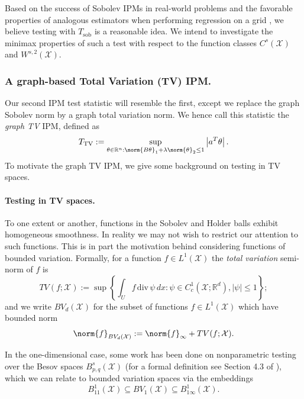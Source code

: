 \documentclass{article}
\newcommand{\Reals}{\mathbb{R}}
\newcommand{\abs}[1]{\left \lvert #1 \right \rvert}
\newcommand{\1}{\mathbf{1}}
\newcommand{\dive}{\mathrm{div}}
\theoremstyle{alden}
\theoremstyle{aldenthm}
\theoremstyle{definition}
\theoremstyle{remark}
\begin{document}
Based on the success of Sobolev IPMs in real-world problems \citet{mroueh17,arbel18} and the favorable properties of analogous estimators when performing regression on a grid \citet{sadhanala16}, we believe testing with $T_{\textrm{sob}}$ is a reasonable idea. We intend to investigate the minimax properties of such a test with respect to the function classes $C^s(\mathcal{X})$ and $W^{s,2}(\mathcal{X})$.


\subsubsection{A graph-based Total Variation (TV) IPM.}
Our second IPM test statistic will resemble the first, except we replace the graph Sobolev norm by a graph total variation norm. We hence call this statistic the \emph{graph TV} IPM, defined as
\begin{equation*}
T_{\mathrm{TV}} := \sup_{\theta \in \Reals^n: \norm{B\theta}_1 + \lambda\norm{\theta}_2 \leq 1} \abs{a^T \theta}.
\end{equation*}
To motivate the graph TV IPM, we give some background on testing in TV spaces.

\paragraph{Testing in TV spaces.}

To one extent or another, functions in the Sobolev and Holder balls exhibit homogeneous smoothness. In reality we may not wish to restrict our attention to such functions. This is in part the motivation behind considering functions of bounded variation. Formally, for a function $f \in L^1(\mathcal{X})$ the \emph{total variation} semi-norm of $f$ is \citet{evans15}
\begin{equation*}
TV(f;\mathcal{X}) := \sup \left\{ \int_U f \, \dive \, \psi \,dx : \psi \in C_c^1(\mathcal{X}; \Reals^d), \abs{\psi} \leq 1 \right\};
\end{equation*}
and we write $BV_d(\mathcal{X})$ for the subset of functions $f \in L^1(\mathcal{X})$ which have bounded norm
\begin{equation*}
\norm{f}_{BV_d(\mathcal{X})} := \norm{f}_{\infty} + TV(f;\mathcal{X}).
\end{equation*}

In the one-dimensional case, some work has been done on nonparametric testing over the Besov spaces $B_{p,q}^s(\mathcal{X})$ (for a formal definition see Section 4.3 of \cite{gine16}), which we can relate to bounded variation spaces via the embeddings
\begin{equation}
\label{eqn:besov_embeddings}
B_{11}^1(\mathcal{X}) \subseteq BV_1(\mathcal{X}) \subseteq B_{1\infty}^1(\mathcal{X}).
\end{equation}
\end{document}
